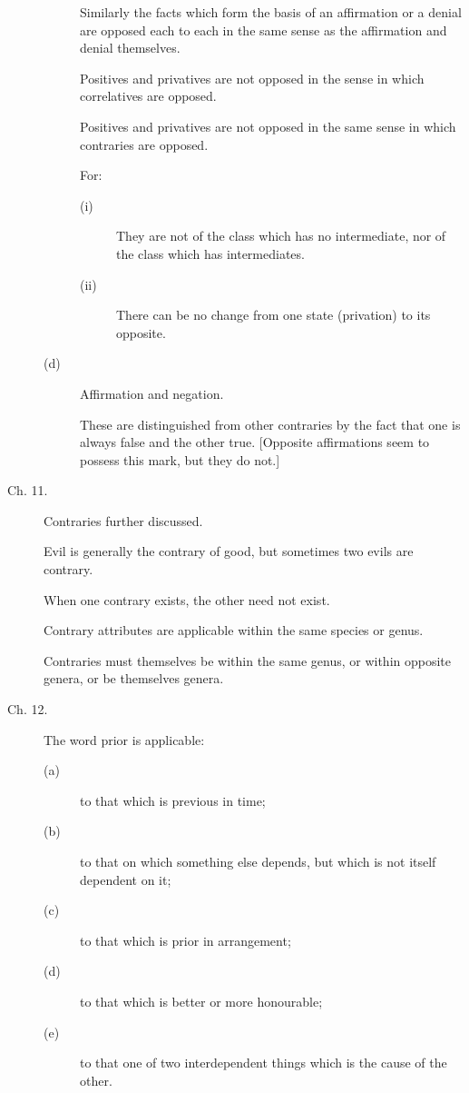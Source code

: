 \begin{description}
\begin{description}
Similarly the facts which form the basis of an affirmation or a denial 
are opposed each to each in the same sense as the affirmation and 
denial themselves. 

Positives and privatives are not opposed in the sense in which 
correlatives are opposed. 

Positives and privatives are not opposed in the same sense in which 
contraries are opposed. 

For:
\begin{description}
\item[(i)] They are not of the class which has no intermediate, nor of the class which has intermediates. 
\item[(ii)] There can be no change from one state (privation) to its opposite.
\end{description}
\item[(d)] Affirmation and negation.

These are distinguished from other contraries by the fact that one is always false and the other true.
[Opposite affirmations seem to possess this mark, but they do not.] 
\end{description}

\item[Ch. 11.] Contraries further discussed. 

Evil is generally the contrary of good, but sometimes two evils are contrary. 

When one contrary exists, the other need not exist. 

Contrary attributes are applicable within the same species or genus. 

Contraries must themselves be within the same genus, or within opposite genera, or be themselves genera. 

\item[Ch. 12.] The word prior is applicable: 
\begin{description}
\item[(a)] to that which is previous in time; 
\item[(b)] to that on which something else depends, but which is not itself dependent on it;
\item[(c)] to that which is prior in arrangement; 
\item[(d)] to that which is better or more honourable; 
\item[(e)] to that one of two interdependent things which is the cause of the other. 
\end{description}


\end{description}

